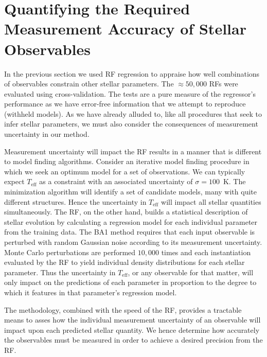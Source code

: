 \section[Quantifying the Required Measurement Accuracy]{Quantifying the Required Measurement Accuracy of Stellar Observables}
\label{sec:accu}
In the previous section we used RF regression to appraise how well combinations of observables constrain other stellar parameters. The ${\approx 50,000}$ RFs were   
evaluated using cross-validation. The tests are a pure measure of the regressor's performance as we have error-free information that we attempt to reproduce (withheld models).
 As we have already alluded to, like all procedures that seek to infer stellar parameters, we must also consider the consequences of measurement uncertainty in our method. 

 
Measurement uncertainty will impact the RF results in a manner that is different to model finding algorithms. Consider an iterative model finding procedure in which we seek an  optimum model for a set of observations. We can typically expect $T_{\text{eff}}$ as a constraint with an associated  uncertainty of ${\sigma = 100}$~K.  The minimization algorithm will identify a set of candidate models, many with quite different structures. Hence the uncertainty in $T_{\text{eff}}$  will impact %
all stellar quantities simultaneously.  The  RF, on the other hand,
 builds a statistical description of stellar evolution by calculating a regression model for each individual parameter from the training data. 
 The BA1 method requires that each input observable is perturbed with random Gaussian noise according to its measurement uncertainty. Monte Carlo perturbations are performed $10,000$ times and each instantiation evaluated by the RF to yield individual density distributions for each stellar parameter. Thus the uncertainty in $T_{\text{eff}}$, or any observable for that matter, will only impact on the predictions 
 of each parameter in proportion to the degree to which it features in that parameter's regression model.  

 
 The methodology, combined with the speed of the RF, provides a tractable means to 
 asses how the individual measurement uncertainty of an observable will impact upon each predicted stellar quantity. We hence determine  how accurately the observables must be measured in order to achieve a desired precision from the RF.
 
